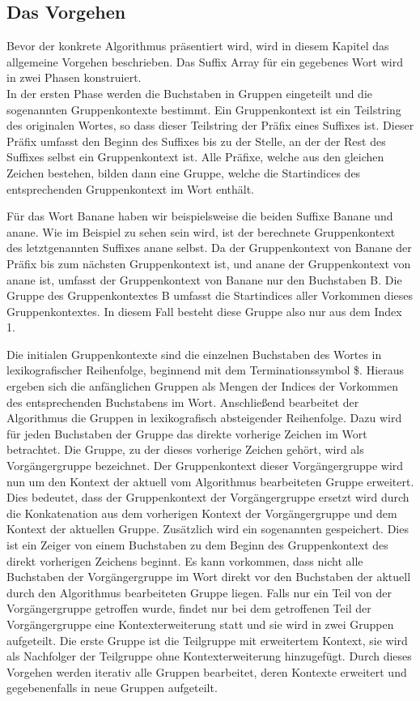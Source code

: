 \newpage
\subsection{Das Vorgehen}
\label{gsaca:chapter2}
%
Bevor der konkrete Algorithmus präsentiert  wird, wird in diesem Kapitel das allgemeine Vorgehen beschrieben. 
Das Suffix Array für ein gegebenes Wort wird in zwei Phasen konstruiert.\\

In der ersten Phase werden die Buchstaben in Gruppen eingeteilt und die sogenannten Gruppenkontexte bestimmt.
Ein Gruppenkontext ist ein Teilstring des originalen Wortes, so dass dieser Teilstring der Präfix eines Suffixes ist. 
Dieser Präfix umfasst den Beginn des Suffixes bis zu der Stelle, an der der Rest des Suffixes selbst ein Gruppenkontext ist. 
Alle Präfixe, welche aus den gleichen Zeichen bestehen, bilden dann eine Gruppe, welche die Startindices des entsprechenden Gruppenkontext im Wort enthält.

Für das Wort Banane haben wir beispielsweise die beiden Suffixe Banane und anane. 
Wie im Beispiel zu sehen sein wird, ist der berechnete Gruppenkontext des letztgenannten Suffixes anane selbst. 
Da der Gruppenkontext von Banane der Präfix bis zum nächsten Gruppenkontext ist, und anane der Gruppenkontext von anane ist, umfasst der Gruppenkontext von Banane nur den Buchstaben B. 
Die Gruppe des Gruppenkontextes B umfasst die Startindices aller Vorkommen dieses Gruppenkontextes.
In diesem Fall besteht diese Gruppe also nur aus dem Index 1.

Die initialen Gruppenkontexte sind die einzelnen Buchstaben des Wortes in lexikografischer Reihenfolge, beginnend mit dem Terminationssymbol \$.
Hieraus ergeben sich die anfänglichen Gruppen als Mengen der Indices der Vorkommen des entsprechenden Buchstabens im Wort.
Anschließend bearbeitet der Algorithmus die Gruppen in lexikografisch absteigender Reihenfolge. 
Dazu wird für jeden Buchstaben der Gruppe das direkte vorherige Zeichen im Wort betrachtet.
Die Gruppe, zu der dieses vorherige Zeichen gehört, wird als Vorgängergruppe bezeichnet.
Der Gruppenkontext dieser Vorgängergruppe wird nun um den Kontext der aktuell vom Algorithmus bearbeiteten Gruppe erweitert.
Dies bedeutet, dass der Gruppenkontext der Vorgängergruppe ersetzt wird durch die Konkatenation aus dem vorherigen Kontext der Vorgängergruppe und dem Kontext der aktuellen Gruppe.
Zusätzlich wird ein sogenannten \prevpointer gespeichert.
Dies ist ein Zeiger von einem Buchstaben zu dem Beginn des Gruppenkontext des direkt vorherigen Zeichens beginnt.
Es kann vorkommen, dass nicht alle Buchstaben der Vorgängergruppe im Wort direkt vor den Buchstaben der aktuell durch den Algorithmus bearbeiteten Gruppe liegen.
Falls nur ein Teil von der Vorgängergruppe getroffen wurde, findet nur bei dem getroffenen Teil der Vorgängergruppe eine Kontexterweiterung statt und sie wird in zwei Gruppen aufgeteilt.
Die erste Gruppe ist die Teilgruppe mit erweitertem Kontext, sie wird als Nachfolger der Teilgruppe ohne Kontexterweiterung hinzugefügt. 
Durch dieses Vorgehen werden iterativ alle Gruppen bearbeitet, deren Kontexte erweitert und gegebenenfalls in neue Gruppen aufgeteilt.\\

